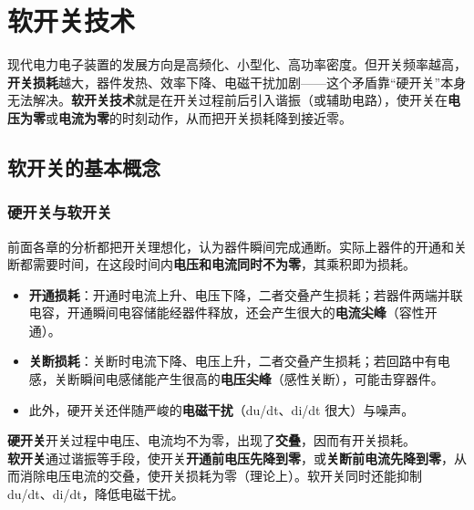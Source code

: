 \chapter{软开关技术}

现代电力电子装置的发展方向是高频化、小型化、高功率密度。但开关频率越高，\textbf{开关损耗}越大，器件发热、效率下降、电磁干扰加剧——这个矛盾靠“硬开关”本身无法解决。\textbf{软开关技术}就是在开关过程前后引入谐振（或辅助电路），使开关在\textbf{电压为零}或\textbf{电流为零}的时刻动作，从而把开关损耗降到接近零。

\section{软开关的基本概念}

\subsection{硬开关与软开关}

前面各章的分析都把开关理想化，认为器件瞬间完成通断。实际上器件的开通和关断都需要时间，在这段时间内\textbf{电压和电流同时不为零}，其乘积即为损耗。

\begin{itemize}
  \item \textbf{开通损耗}：开通时电流上升、电压下降，二者交叠产生损耗；若器件两端并联电容，开通瞬间电容储能经器件释放，还会产生很大的\textbf{电流尖峰}（容性开通）。
  \item \textbf{关断损耗}：关断时电流下降、电压上升，二者交叠产生损耗；若回路中有电感，关断瞬间电感储能产生很高的\textbf{电压尖峰}（感性关断），可能击穿器件。
  \item 此外，硬开关还伴随严峻的\textbf{电磁干扰}（du/dt、di/dt 很大）与噪声。
\end{itemize}

\begin{tcolorbox}[enhanced,breakable,colback=highlight,colframe=yhbAccent!30!white,boxrule=0.5pt,arc=2.5pt,left=11pt,right=11pt,top=9pt,bottom=9pt,boxsep=0pt,before skip=11pt,after skip=11pt]
\textbf{硬开关}\quad 开关过程中电压、电流均不为零，出现了\textbf{交叠}，因而有开关损耗。\\
\textbf{软开关}\quad 通过谐振等手段，使开关\textbf{开通前电压先降到零}，或\textbf{关断前电流先降到零}，从而消除电压电流的交叠，使开关损耗为零（理论上）。软开关同时还能抑制 du/dt、di/dt，降低电磁干扰。
\end{tcolorbox}

